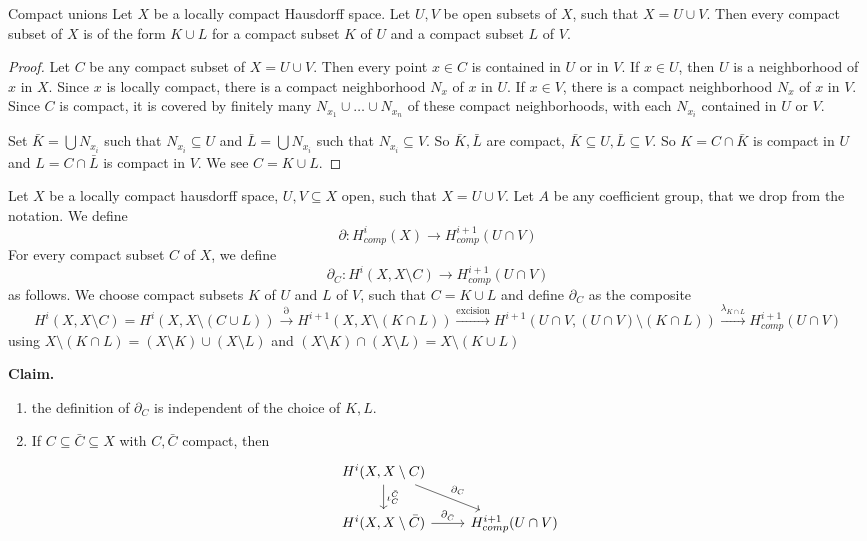 \documentclass[language=english]{TemplateLecture}
\begin{document}
\begin{lem}{Compact unions}{}
    Let \(X\) be a locally compact Hausdorff space. Let \(U,V\) be open subsets of \(X\), such that \(X = U \cup V\). Then every compact subset of \(X\) is of the form \(K \cup L\) for a compact subset \(K\) of \(U\) and a compact subset \(L\) of \(V\).
\end{lem}

\begin{proof}
    Let \(C\) be any compact subset of \(X = U \cup V\). Then every point \(x \in C\) is contained in \(U\) or in \(V\). If \(x \in U\), then \(U\) is a neighborhood of \(x\) in \(X\). Since \(x\) is locally compact, there is a compact neighborhood \(N_x\) of \(x\) in \(U\). If \(x \in V\), there is a compact neighborhood \(N_x\) of \(x\) in \(V\). Since \(C\) is compact, it is covered by finitely many \(N_{x_1} \cup \dots \cup N_{x_n}\) of these compact neighborhoods, with each \(N_{x_i}\) contained in \(U\) or \(V\).

    Set \(\bar K = \bigcup N_{x_i}\) such that \(N_{x_i} \subseteq U\) and \(\bar L = \bigcup N_{x_i}\) such that \(N_{x_i} \subseteq V\). So \(\bar K, \bar L\) are compact, \(\bar K \subseteq U, \bar L \subseteq V\). So \(K = C \cap \bar K\) is compact in \(U\) and \(L = C \cap \bar L\) is compact in \(V\). We see \(C = K \cup L\).
\end{proof}

\begin{construction}
    Let \(X\) be a locally compact hausdorff space, \(U, V \subseteq X\) open, such that \(X = U \cup V\). Let \(A\) be any coefficient group, that we drop from the notation. We define
    \[\partial\colon H^i_{comp}(X) \to H_{comp}^{i+1}(U \cap V)\]
    For every compact subset \(C\) of \(X\), we define
    \[\partial_C\colon H^i(X, X\setminus C) \to H^{i+1}_{comp}(U\cap V)\]
    as follows. We choose compact subsets \(K\) of \(U\) and \(L\) of \(V\), such that \(C = K \cup L\) and define \(\partial_C\) as the composite
    \[H^i(X, X\setminus C) = H^i(X, X\setminus (C \cup L)) \xrightarrow{\partial} H^{i+1}(X,X\setminus(K \cap L)) \xrightarrow{\text{excision}} H^{i+1}(U \cap V, (U \cap V) \setminus (K \cap L)) \xrightarrow{\lambda_{K \cap L}} H_{comp}^{i+1}(U\cap V)\]
    using \(X\setminus (K \cap L) = (X\setminus K) \cup (X\setminus L)\) and \((X\setminus K) \cap (X\setminus L) = X \setminus (K \cup L)\)

    \textbf{Claim.}
    \begin{enumerate}
        \item the definition of \(\partial_C\) is independent of the choice of \(K,L\).
        \item If \(C \subseteq \bar C \subseteq X\) with \(C, \bar C\) compact, then
        \[\begin{tikzcd}
            H^i(X, X\setminus C) \ar[rd, "\partial_C"] \ar[d, "\iota_C^{\bar C}"] & \\
            H^i(X, X\setminus \bar C) \ar[r, "\partial_{\bar C}"] & H_{comp}^{i+1}(U\cap V) \\
        \end{tikzcd}\]
    \end{enumerate}
\end{construction}
\end{document}
